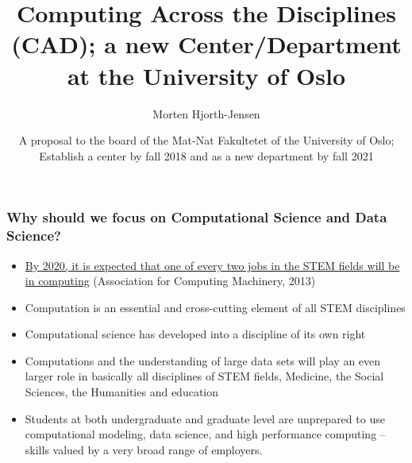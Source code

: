 \documentclass{beamer}
\begin{document}

\newcommand{\exercisesection}[1]{\subsection*{#1}}







\title{Computing Across the Disciplines (CAD); a new Center/Department at the University of Oslo}


\author{Morten Hjorth-Jensen}

\date{A proposal to the board of the Mat-Nat Fakultetet of the University of Oslo; Establish a center by fall 2018 and as a new department by fall 2021
}

\begin{frame}
\titlepage
\end{frame}

\begin{frame}
\frametitle{Why should we focus on Computational Science and Data Science?}

\begin{itemize}
\item \href{{http://pathways.acm.org/executive-summary.html}}{By 2020, it is expected that one of every two jobs in the STEM fields will be in computing} (Association for Computing Machinery, 2013)

\item Computation is an essential and cross-cutting element of all STEM disciplines

\item Computational science has developed into a discipline of its own right

\item Computations and the understanding of large data sets will play an even larger role in basically all disciplines of STEM fields, Medicine, the Social Sciences, the Humanities and  education

\item Students at both undergraduate and graduate level are unprepared to use computational modeling, data science, and high performance computing – skills valued by a very broad range of employers.
\end{itemize}

\noindent
\end{frame}
\end{document}
